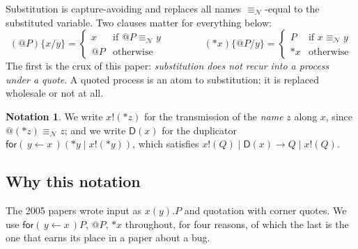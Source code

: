 \documentclass[11pt]{article}
\makeatletter
\theoremstyle{definition}
\newtheorem{notation}[definition]{Notation}
\theoremstyle{plain}
\theoremstyle{remark}
\newcommand{\quo}[1]{@#1}
\newcommand{\drp}[1]{{*}#1}
\newcommand{\inp}[3]{\mathsf{for}(\,#1 \leftarrow #2\,)#3}
\newcommand{\out}[2]{#1!(#2)}
\newcommand{\nequiv}{\equiv_{\mathcal{N}}}
\newcommand{\Dup}{\mathsf{D}}
\makeatother
\begin{document}
Substitution is capture-avoiding and replaces all names $\nequiv$-equal to
the substituted variable. Two clauses matter for everything below:
\[
(\quo{P})\{x/y\} =
  \begin{cases} x & \text{if } \quo{P} \nequiv y\\ \quo{P} & \text{otherwise}\end{cases}
\qquad\qquad
(\drp{x})\{\quo{P}/y\} =
  \begin{cases} P & \text{if } x \nequiv y \\ \drp{x} & \text{otherwise}\end{cases}
\]
The first is the crux of this paper: \emph{substitution does not recur
into a process under a quote}. A quoted process is an atom to
substitution; it is replaced wholesale or not at all.

\begin{notation}
We write $\out{x}{\drp{z}}$ for the transmission of the \emph{name} $z$
along $x$, since $\quo{(\drp{z})} \nequiv z$; and we write $\Dup(x)$ for
the duplicator $\inp{y}{x}{(\drp{y} \mid \out{x}{\drp{y}})}$, which
satisfies $\out{x}{Q} \mid \Dup(x) \to Q \mid \out{x}{Q}$.
\end{notation}

\subsection{Why this notation}\label{sec:notation}

The 2005 papers wrote input as $x(y).P$ and quotation with corner
quotes. We use $\inp{y}{x}{P}$, $\quo{P}$, $\drp{x}$ throughout, for four
reasons, of which the last is the one that earns its place in a paper
about a bug.
\end{document}
